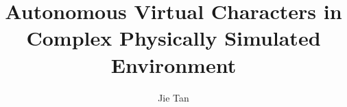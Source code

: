 \documentclass{gatech-thesis}
\title{Autonomous Virtual Characters in Complex Physically Simulated Environment}
\author{Jie Tan}
\begin{document}

%
\begin{preliminary}
\begin{acknowledgements}

\end{acknowledgements}
%
\contents
%
\begin{summary}

\end{summary}
\end{preliminary}
%







\begin{postliminary}
\end{postliminary}
\end{document}
